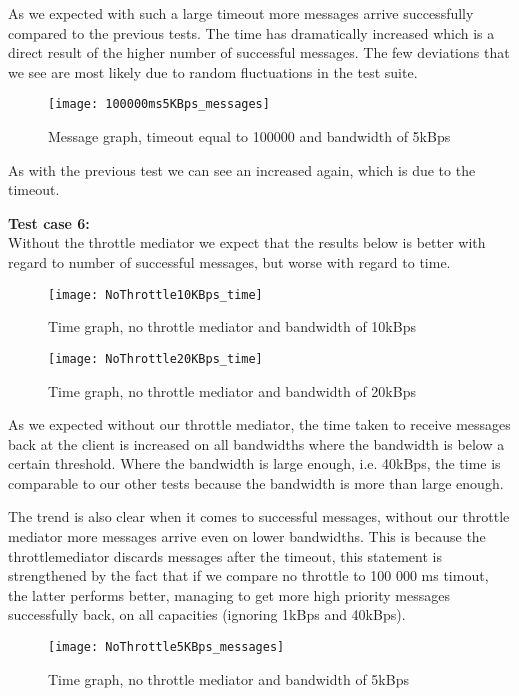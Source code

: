 	As we expected with such a large timeout more messages arrive successfully compared to the previous tests. The time has dramatically increased which is a direct result of the higher number of successful messages. The few deviations that we see are most likely due to random fluctuations in the test suite. 
	
	\begin{figure}[H]
		\centering
		\texttt{[image: 100000ms5KBps\_messages]}
		\caption{Message graph, timeout equal to 100000 and bandwidth of 5kBps} 
		\label{figure:results:100000ms5KBps_messages}
	\end{figure}
	As with the previous test we can see an increased again, which is due to the timeout.
    
    \textbf{Test case 6:}\\
    Without the throttle mediator we expect that the results below is better with regard to number of successful messages, but worse with regard to time.
    \begin{figure}[H]
		\centering
		\texttt{[image: NoThrottle10KBps\_time]}
		\caption{Time graph, no throttle mediator and bandwidth of 10kBps} 
		\label{figure:results:NoThrottle10KBps_time}
	\end{figure}
	
	\begin{figure}[H]
		\centering
		\texttt{[image: NoThrottle20KBps\_time]}
		\caption{Time graph, no throttle mediator and bandwidth of 20kBps} 
		\label{figure:results:NoThrottle20KBps_time}
	\end{figure}
	
	As we expected without our throttle mediator, the time taken to receive messages back at the client is increased on all bandwidths where the bandwidth is below a certain threshold. Where the bandwidth is large enough, i.e. 40kBps, the time is comparable to our other tests because the bandwidth is more than large enough.
	
	
	The trend is also clear when it comes to successful messages, without our throttle mediator more messages arrive even on lower bandwidths. This is because the throttlemediator discards messages after the timeout, this statement is strengthened by the fact that if we compare no throttle to 100 000 ms timout, the latter performs better, managing to get more high priority messages successfully back, on all capacities (ignoring 1kBps and 40kBps).
	
	\begin{figure}[H]
		\centering
		\texttt{[image: NoThrottle5KBps\_messages]}
		\caption{Time graph, no throttle mediator and bandwidth of 5kBps} 
		\label{figure:results:NoThrottle5KBps_messages}
	\end{figure}\\



